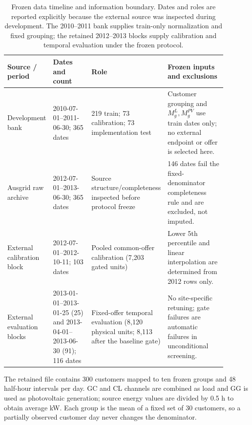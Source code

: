 \documentclass[11pt]{article}
\begin{document}
\begin{table}[t]
\centering
\caption{Frozen data timeline and information boundary. Dates and roles are reported explicitly because the external source was inspected during development. The 2010--2011 bank supplies train-only normalization and fixed grouping; the retained 2012--2013 blocks supply calibration and temporal evaluation under the frozen protocol.}
\label{tab:timeline}
\small
\begin{tabular}{p{0.18\linewidth}p{0.22\linewidth}p{0.18\linewidth}p{0.31\linewidth}}
\toprule
Source / period & Dates and count & Role & Frozen inputs and exclusions\\
\midrule
Development bank & 2010-07-01--2011-06-30; 365 dates & 219 train; 73 calibration; 73 implementation test & Customer grouping and $M_g^L,M_g^{PV}$ use train dates only; no external endpoint or offer is selected here.\\
Ausgrid raw archive & 2012-07-01--2013-06-30; 365 dates & Source structure/completeness inspected before protocol freeze & 146 dates fail the fixed-denominator completeness rule and are excluded, not imputed.\\
External calibration block & 2012-07-01--2012-10-11; 103 dates & Pooled common-offer calibration (7,203 gated units) & Lower 5th percentile and linear interpolation are determined from 2012 rows only.\\
External evaluation blocks & 2013-01-01--2013-01-25 (25) and 2013-04-01--2013-06-30 (91); 116 dates & Fixed-offer temporal evaluation (8,120 physical units; 8,113 after the baseline gate) & No site-specific retuning; gate failures are automatic failures in unconditional screening.\\
\bottomrule
\end{tabular}
\end{table}

The retained file contains 300 customers mapped to ten frozen groups and 48 half-hour intervals per day. GC and CL channels are combined as load and GG is used as photovoltaic generation; source energy values are divided by 0.5 h to obtain average kW. Each group is the mean of a fixed set of 30 customers, so a partially observed customer day never changes the denominator.
\end{document}
